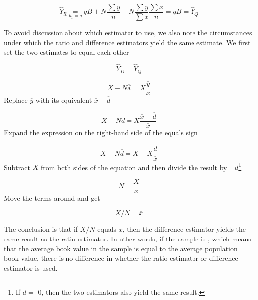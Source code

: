 \begin{equation*}
  \hat{Y}_R \underset{b_1 = q}{=} qB + N \frac{\sum{y}}{n} - N \frac{\sum{y}}{\sum{x}} \frac{\sum{x}}{n} = qB = \hat{Y}_Q
\end{equation*}

To avoid discussion about which estimator to use, we also note the circumstances under which the ratio and difference estimators yield the same estimate. We first set the two estimates to equal each other

\begin{equation*}
\hat{Y}_D = \hat{Y}_Q
\end{equation*}

\begin{equation*}
X - N \overline{d} = X \frac{\overline{y}}{\overline{x}}
\end{equation*}
Replace $\overline{y}$ with its equivalent $\overline{x} - \overline{d}$

\begin{equation*}
X - N \overline{d} = X \frac{\overline{x} - \overline{d}}{\overline{x}}
\end{equation*}
Expand the expression on the right-hand side of the equals sign

\begin{equation*}
X - N \overline{d} = X - X\frac{\overline{d}}{\overline{x}}
\end{equation*}
Subtract $X$ from both sides of the equation and then divide the result by $-\overline{d}$\footnote{If $\overline{d} = $ 0, then the two estimators also yield the same result.}

\begin{equation*}
N = \frac{X}{\overline{x}}
\end{equation*}
Move the terms around and get

\begin{equation*}
X/N = \overline{x}
\end{equation*}

The conclusion is that if $X / N$ equals $\overline{x}$, then the difference estimator yields the same result as the ratio estimator. In other words, if the sample is , which means that the average book value in the sample is equal to the average population book value, there is no difference in whether the ratio estimator or  difference estimator is used.

